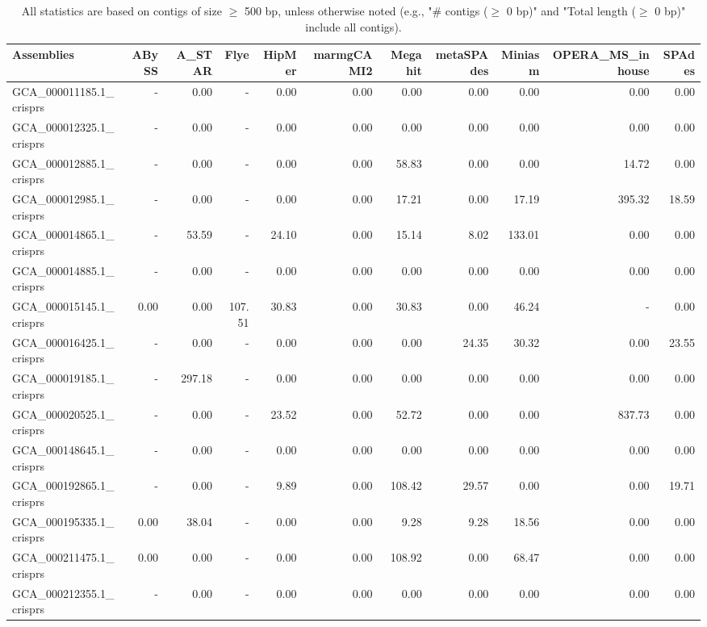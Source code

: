 \documentclass[12pt,a4paper]{article}
\begin{document}
\begin{table}[ht]
\begin{center}
\caption{All statistics are based on contigs of size $\geq$ 500 bp, unless otherwise noted (e.g., "\# contigs ($\geq$ 0 bp)" and "Total length ($\geq$ 0 bp)" include all contigs).}
\begin{tabular}{|l*{10}{|r}|}
\hline
Assemblies & ABySS & A\_STAR & Flye & HipMer & marmgCAMI2 & Megahit & metaSPAdes & Miniasm & OPERA\_MS\_inhouse & SPAdes \\ \hline
GCA\_000011185.1\_crisprs & - & 0.00 & - & 0.00 & 0.00 & 0.00 & 0.00 & 0.00 & 0.00 & 0.00 \\ \hline
GCA\_000012325.1\_crisprs & - & 0.00 & - & 0.00 & 0.00 & 0.00 & 0.00 & 0.00 & 0.00 & 0.00 \\ \hline
GCA\_000012885.1\_crisprs & - & 0.00 & - & 0.00 & 0.00 & 58.83 & 0.00 & 0.00 & 14.72 & 0.00 \\ \hline
GCA\_000012985.1\_crisprs & - & 0.00 & - & 0.00 & 0.00 & 17.21 & 0.00 & 17.19 & 395.32 & 18.59 \\ \hline
GCA\_000014865.1\_crisprs & - & 53.59 & - & 24.10 & 0.00 & 15.14 & 8.02 & 133.01 & 0.00 & 0.00 \\ \hline
GCA\_000014885.1\_crisprs & - & 0.00 & - & 0.00 & 0.00 & 0.00 & 0.00 & 0.00 & 0.00 & 0.00 \\ \hline
GCA\_000015145.1\_crisprs & 0.00 & 0.00 & 107.51 & 30.83 & 0.00 & 30.83 & 0.00 & 46.24 & - & 0.00 \\ \hline
GCA\_000016425.1\_crisprs & - & 0.00 & - & 0.00 & 0.00 & 0.00 & 24.35 & 30.32 & 0.00 & 23.55 \\ \hline
GCA\_000019185.1\_crisprs & - & 297.18 & - & 0.00 & 0.00 & 0.00 & 0.00 & 0.00 & 0.00 & 0.00 \\ \hline
GCA\_000020525.1\_crisprs & - & 0.00 & - & 23.52 & 0.00 & 52.72 & 0.00 & 0.00 & 837.73 & 0.00 \\ \hline
GCA\_000148645.1\_crisprs & - & 0.00 & - & 0.00 & 0.00 & 0.00 & 0.00 & 0.00 & 0.00 & 0.00 \\ \hline
GCA\_000192865.1\_crisprs & - & 0.00 & - & 9.89 & 0.00 & 108.42 & 29.57 & 0.00 & 0.00 & 19.71 \\ \hline
GCA\_000195335.1\_crisprs & 0.00 & 38.04 & - & 0.00 & 0.00 & 9.28 & 9.28 & 18.56 & 0.00 & 0.00 \\ \hline
GCA\_000211475.1\_crisprs & 0.00 & 0.00 & - & 0.00 & 0.00 & 108.92 & 0.00 & 68.47 & 0.00 & 0.00 \\ \hline
GCA\_000212355.1\_crisprs & - & 0.00 & - & 0.00 & 0.00 & 0.00 & 0.00 & 0.00 & 0.00 & 0.00 \\ \hline

\end{tabular}
\end{center}
\end{table}
\end{document}
